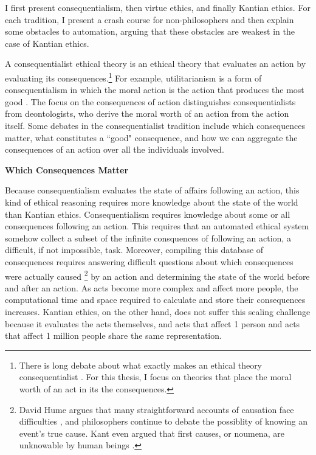 \begin{isabellebody}
\begin{isamarkuptext}
I first present consequentialism, then virtue ethics, and finally Kantian ethics. For each 
tradition, I present a crash course for non-philosophers and then explain some obstacles to automation, 
arguing that these obstacles are weakest in the case of Kantian ethics.%
\end{isamarkuptext}\isamarkuptrue%
%
\isadelimdocument
%
\endisadelimdocument
%
\isatagdocument
%
\isamarkuptrue%
%
\endisatagdocument
{\isafolddocument}%
%
\isadelimdocument
%
\endisadelimdocument
%
\begin{isamarkuptext}%
A consequentialist ethical theory is an ethical theory that evaluates an 
action by evaluating its consequences.\footnote{There is long debate about what exactly makes an ethical theory consequentialist \citep{consequentialismsep}. 
For this thesis, I focus on theories that place the moral worth of an act in its the consequences.} For example, 
utilitarianism is a form of consequentialism in which the moral action 
is the action that produces the most good \citep{utilsep}. The focus
on the consequences of action distinguishes consequentialists from deontologists, who derive the moral worth
of an action from the action itself. Some debates in the consequentialist tradition include 
which consequences matter, what constitutes a ``good" consequence, and how we can 
aggregate the consequences of an action over all the individuals involved.%
\end{isamarkuptext}\isamarkuptrue%
%
\begin{isamarkuptext}%
\noindent \textbf{Which Consequences Matter}%
\end{isamarkuptext}\isamarkuptrue%
%
\begin{isamarkuptext}%
Because consequentialism evaluates the state of affairs following an action, this kind of ethical 
reasoning requires more knowledge about the state of the world than Kantian ethics. Consequentialism
requires knowledge about some or all consequences following an action. This requires that an automated 
ethical system somehow collect a subset of the infinite consquences of following an action, a difficult, 
if not impossible, task. Moreover, compiling this database of consequences requires 
answering difficult questions about which consequences were actually caused \footnote
{David Hume argues that many straightforward accounts of causation face difficulties \citep{hume}, 
and philosophers continue to debate the possiblity of knowing an event's true cause. Kant even argued
that first causes, or noumena, are unknowable by human beings \citep{kantnoumena}.} by an action and
determining the state of the world before and after an action. As acts become
more complex and affect more people, the computational time and space required to calculate and store
their consequences increases. Kantian ethics, on the other hand, does not suffer this scaling
challenge because it evaluates the acts themselves, and acts that affect 1 person and acts that 
affect 1 million people share the same representation.


\end{isamarkuptext}
\end{isabellebody}

